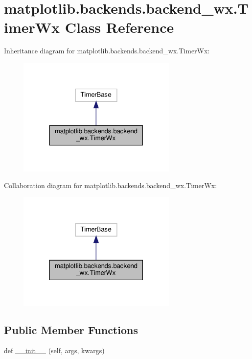 \hypertarget{classmatplotlib_1_1backends_1_1backend__wx_1_1TimerWx}{}\section{matplotlib.\+backends.\+backend\+\_\+wx.\+Timer\+Wx Class Reference}
\label{classmatplotlib_1_1backends_1_1backend__wx_1_1TimerWx}


Inheritance diagram for matplotlib.\+backends.\+backend\+\_\+wx.\+Timer\+Wx\+:
\nopagebreak
\begin{figure}[H]
\begin{center}
\leavevmode
\includegraphics[width=223pt]{classmatplotlib_1_1backends_1_1backend__wx_1_1TimerWx__inherit__graph}
\end{center}
\end{figure}


Collaboration diagram for matplotlib.\+backends.\+backend\+\_\+wx.\+Timer\+Wx\+:
\nopagebreak
\begin{figure}[H]
\begin{center}
\leavevmode
\includegraphics[width=223pt]{classmatplotlib_1_1backends_1_1backend__wx_1_1TimerWx__coll__graph}
\end{center}
\end{figure}
\subsection*{Public Member Functions}
\begin{DoxyCompactItemize}
\item 
def \hyperlink{classmatplotlib_1_1backends_1_1backend__wx_1_1TimerWx_a6a48183766604d46f1e7fd7a4c432924}{\+\_\+\+\_\+init\+\_\+\+\_\+} (self, args, kwargs)
\end{DoxyCompactItemize}


